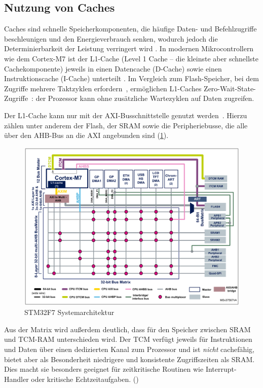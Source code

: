 \subsection{Nutzung von Caches}

Caches sind schnelle Speicherkomponenten, die häufige Daten- und Befehlzugriffe
beschleunigen und den Energieverbrauch senken, wodurch jedoch die
Determinierbarkeit der Leistung verringert wird \cite{ka001150}. In modernen
Mikrocontrollern wie dem Cortex-M7 ist der L1-Cache (Level 1 Cache -- die
kleinste aber schnellste Cachekomponente) jeweils in einen Datencache (D-Cache)
sowie einen Instruktionscache (I-Cache) unterteilt \cite[S. 6]{an4667}. Im
Vergleich zum Flash-Speicher, bei dem Zugriffe mehrere Taktzyklen
erfordern~\cite{stm32_memory_sections}, ermöglichen L1-Caches
Zero-Wait-State-Zugriffe~\cite[S. 6]{an4667}: der Prozessor kann ohne
zusätzliche Wartezyklen auf Daten zugreifen.

Der L1-Cache kann nur mit der \ac{AXI}-Busschnittstelle genutzt werden~\cite[S.
4]{an4839}. Hierzu zählen unter anderem der Flash, der \ac{SRAM} sowie die
Peripheriebusse, die alle über den \ac{AHB}-Bus an die AXI angebunden sind
(\ref{fig:m7_sys_arch}).

\begin{figure}[htb]
    \centering
    \includegraphics[width=1\textwidth]{assets/m7_system_arch}
    \caption{STM32F7 Systemarchitektur \cite[S. 9]{an4667}}
    \label{fig:m7_sys_arch}
\end{figure}

Aus der Matrix wird außerdem deutlich, dass für den Speicher zwischen SRAM und
TCM-RAM unterschieden wird. Der \ac{TCM} verfügt jeweils für Instruktionen und
Daten über einen dedizierten Kanal zum Prozessor und ist \textit{nicht}
cachefähig, bietet aber als Besonderheit niedrigere und konsistente
Zugriffszeiten als SRAM. Dies macht sie besonders geeignet für zeitkritische
Routinen wie Interrupt-Handler oder kritische Echtzeitaufgaben.
(\cite{arm_den0042})

